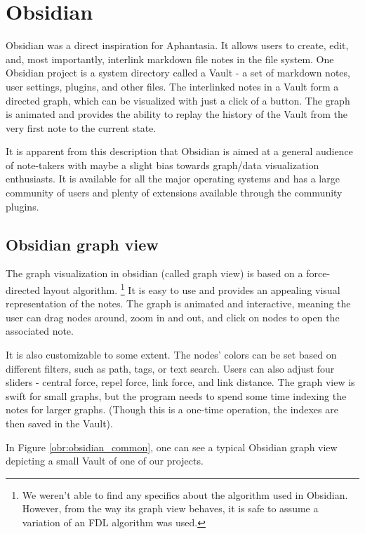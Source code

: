 \section{Obsidian}

Obsidian \cite{obsidian_website} was a direct inspiration for Aphantasia.
It allows users to create, edit, and, most importantly, interlink markdown file notes in the file system.
One Obsidian project is a system directory called a Vault - a set of markdown notes, user settings, plugins, and other files.
The interlinked notes in a Vault form a directed graph, which can be visualized with just a click of a button.
The graph is animated and provides the ability to replay the history of the Vault from the very first note to the current state.

It is apparent from this description that Obsidian is aimed at a general audience of note-takers 
with maybe a slight bias towards graph/data visualization enthusiasts.
It is available for all the major operating systems and has a large community of users and plenty of extensions available through the
community plugins.

\subsection*{Obsidian graph view}

The graph visualization in obsidian (called graph view) is based on a force-directed layout algorithm.
\footnote{We weren't able to find any specifics about the algorithm used in Obsidian.
However, from the way its graph view behaves, it is safe to assume a variation of an FDL algorithm was used.}
It is easy to use and provides an appealing visual representation of the notes.
The graph is animated and interactive, meaning the user can drag nodes around, zoom in and out, and click on nodes to open the associated note.

It is also customizable to some extent.
The nodes' colors can be set based on different filters, such as path, tags, or text search.
Users can also adjust four sliders - central force, repel force, link force, and link distance.
The graph view is swift for small graphs, but the program needs to spend some time indexing the notes for larger graphs.
(Though this is a one-time operation, the indexes are then saved in the Vault).

In Figure \ref{obr:obsidian_common}, one can see a typical Obsidian graph view depicting a small Vault of one of our projects.

